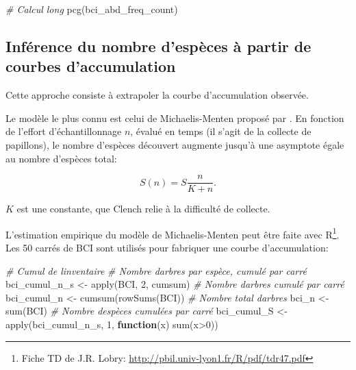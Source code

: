 \documentclass[
  11pt,
  american,
  a4paper,
  extrafontsizes,onecolumn,openright
  ]{memoir}
\newenvironment{Shaded}{\begin{snugshade}}{\end{snugshade}}
\newcommand{\CommentTok}[1]{\textcolor[rgb]{0.56,0.35,0.01}{\textit{#1}}}
\newcommand{\ControlFlowTok}[1]{\textcolor[rgb]{0.13,0.29,0.53}{\textbf{#1}}}
\newcommand{\DecValTok}[1]{\textcolor[rgb]{0.00,0.00,0.81}{#1}}
\newcommand{\FunctionTok}[1]{\textcolor[rgb]{0.00,0.00,0.00}{#1}}
\newcommand{\NormalTok}[1]{#1}
\newcommand{\OtherTok}[1]{\textcolor[rgb]{0.56,0.35,0.01}{#1}}
\newcommand{\SpecialCharTok}[1]{\textcolor[rgb]{0.00,0.00,0.00}{#1}}
\begin{document}
\scriptsize

\begin{Shaded}
\begin{Highlighting}[]
\CommentTok{\# Calcul long}
\FunctionTok{pcg}\NormalTok{(bci\_abd\_freq\_count)}
\end{Highlighting}
\end{Shaded}

\normalsize

\hypertarget{sec-RichesseSAC}{%
\subsection{Inférence du nombre d'espèces à partir de courbes d'accumulation}\label{sec-RichesseSAC}}

Cette approche consiste à extrapoler la courbe d'accumulation observée.

Le modèle le plus connu est celui de Michaelis-Menten \autocite{Michaelis1913} proposé par \textcite{Clench1979}.
En fonction de l'effort d'échantillonnage \(n\), évalué en temps (il s'agit de la collecte de papillons), le nombre d'espèces découvert augmente jusqu'à une asymptote égale au nombre d'espèces total:

\begin{equation} 
  S(n) = S\frac{n}{K + n}.
\end{equation}

\(K\) est une constante, que Clench relie à la difficulté de collecte.

L'estimation empirique du modèle de Michaelis-Menten peut être faite avec R\footnote{ Fiche TD de J.R. Lobry: \url{http://pbil.univ-lyon1.fr/R/pdf/tdr47.pdf}}.
Les 50 carrés de BCI sont utilisés pour fabriquer une courbe d'accumulation:

\scriptsize

\begin{Shaded}
\begin{Highlighting}[]
\CommentTok{\# Cumul de l\textquotesingle{}inventaire}
\CommentTok{\# Nombre d\textquotesingle{}arbres par espèce, cumulé par carré}
\NormalTok{bci\_cumul\_n\_s }\OtherTok{\textless{}{-}} \FunctionTok{apply}\NormalTok{(BCI, }\DecValTok{2}\NormalTok{, cumsum)}
\CommentTok{\# Nombre d\textquotesingle{}arbres cumulé par carré}
\NormalTok{bci\_cumul\_n }\OtherTok{\textless{}{-}} \FunctionTok{cumsum}\NormalTok{(}\FunctionTok{rowSums}\NormalTok{(BCI))}
\CommentTok{\# Nombre total d\textquotesingle{}arbres}
\NormalTok{bci\_n }\OtherTok{\textless{}{-}} \FunctionTok{sum}\NormalTok{(BCI)}
\CommentTok{\# Nombre d\textquotesingle{}espèces cumulées par carré}
\NormalTok{bci\_cumul\_S }\OtherTok{\textless{}{-}} \FunctionTok{apply}\NormalTok{(bci\_cumul\_n\_s, }\DecValTok{1}\NormalTok{, }\ControlFlowTok{function}\NormalTok{(x) }\FunctionTok{sum}\NormalTok{(x}\SpecialCharTok{\textgreater{}}\DecValTok{0}\NormalTok{))}
\end{Highlighting}
\end{Shaded}
\end{document}
